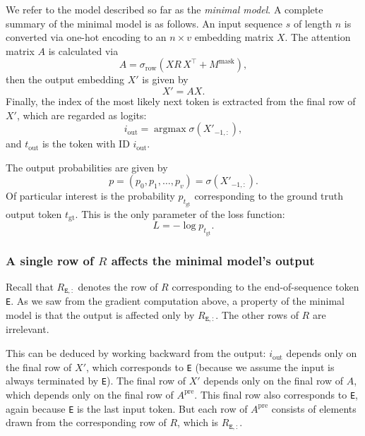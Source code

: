 \documentclass{article}
\newcommand{\tE}{\mathtt{E}}
\newcommand{\Tr}{^{\top}} %
\newcommand{\by}{\times}
\DeclareMathOperator*{\argmax}{argmax}
\begin{document}
We refer to the model described so far as the \emph{minimal model}. A
complete summary of the minimal model is as follows. An input sequence
$s$ of length $n$ is converted via one-hot encoding to an $n \by v$
embedding matrix $X$. The attention matrix $A$ is calculated via
\begin{displaymath}
  A = \sigma_\text{row}(X R\, X\Tr + M^\text{mask}),
\end{displaymath}
then the output embedding $X'$ is given by
\begin{displaymath}
  X' = A X. 
\end{displaymath}
Finally, the index of the most likely next token is extracted from the
final row of $X'$, which are regarded as logits:
\begin{displaymath}
  i_\text{out} = \argmax \sigma(X'_{-1,:}),
\end{displaymath}
and $t_\text{out}$ is the token with ID $i_\text{out}$.

The output probabilities are given by
\begin{displaymath}
  p = (p_0, p_1,\ldots, p_v) = \sigma(X'_{-1,:}).
\end{displaymath}
Of particular interest is the probability $p_{t_\text{gt}}$
corresponding to the ground truth output token $t_\text{gt}$. This is
the only parameter of the loss function:
\begin{displaymath}
  L = -\log p_{t_\text{gt}}.
\end{displaymath}



\subsubsection*{A single row of $R$ affects the minimal model's output}

Recall that $R_{\tE,:}$ denotes the row of $R$ corresponding to the
end-of-sequence token \texttt{E}.  As we saw from the gradient
computation above, a property of the minimal model is that the output
is affected only by $R_{\tE,:}$.  The other rows of $R$ are
irrelevant.

This can be deduced by working backward from the output:
$i_\text{out}$ depends only on the final row of $X'$, which
corresponds to \texttt{E} (because we assume the input is always
terminated by \texttt{E}). The final row of $X'$ depends only on the
final row of $A$, which depends only on the final row of
$A^\text{pre}$. This final row also corresponds to \texttt{E}, again
because \texttt{E} is the last input token. But each row of
$A^\text{pre}$ consists of elements drawn from the corresponding row
of $R$, which is $R_{\tE,:}$.
\end{document}
